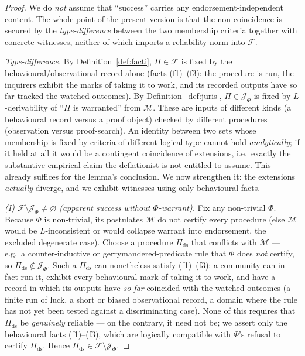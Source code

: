 \documentclass{amsart}
\theoremstyle{definition}
\theoremstyle{plain}
\theoremstyle{remark}
\begin{document}
\begin{proof}
We do \emph{not} assume that ``success'' carries any endorsement-independent
content. The whole point of the present version is that the non-coincidence is
secured by the \emph{type-difference} between the two membership criteria
together with concrete witnesses, neither of which imports a reliability norm
into $\mathcal{F}$.

\emph{Type-difference.} By Definition~\ref{def:facti}, $\Pi\in\mathcal{F}$ is
fixed by the behavioural/observational record alone (facts (f1)--(f3): the
procedure is run, the inquirers exhibit the marks of taking it to work, and its
recorded outputs have so far tracked the watched outcomes). By
Definition~\ref{def:juris}, $\Pi\in\mathcal{J}_\Phi$ is fixed by
$L$-derivability of ``$\Pi$ is warranted'' from $\mathcal{M}$. These are inputs
of different kinds (a behavioural record versus a proof object) checked by
different procedures (observation versus proof-search). An identity between two
sets whose membership is fixed by criteria of different logical type cannot hold
\emph{analytically}; if it held at all it would be a contingent coincidence of
extensions, i.e.\ exactly the substantive empirical claim the deflationist is
not entitled to assume. This already suffices for the lemma's conclusion. We now
strengthen it: the extensions \emph{actually} diverge, and we exhibit witnesses
using only behavioural facts.

\emph{(I) $\mathcal{F}\setminus\mathcal{J}_\Phi\neq\varnothing$ (apparent
success without $\Phi$-warrant).} Fix any non-trivial $\Phi$. Because $\Phi$ is
non-trivial, its postulates $\mathcal{M}$ do not certify every procedure (else
$\mathcal{M}$ would be $L$-inconsistent or would collapse warrant into
endorsement, the excluded degenerate case). Choose a procedure $\Pi_{\mathrm{ds}}$
that conflicts with $\mathcal{M}$ --- e.g.\ a counter-inductive or
gerrymandered-predicate rule that $\Phi$ does \emph{not} certify, so
$\Pi_{\mathrm{ds}}\notin\mathcal{J}_\Phi$. Such a $\Pi_{\mathrm{ds}}$ can
nonetheless satisfy (f1)--(f3): a community can in fact run it, exhibit every
behavioural mark of taking it to work, and have a record in which its outputs
have \emph{so far} coincided with the watched outcomes (a finite run of luck, a
short or biased observational record, a domain where the rule has not yet been
tested against a discriminating case). None of this requires that
$\Pi_{\mathrm{ds}}$ be \emph{genuinely} reliable --- on the contrary, it need
not be; we assert only the behavioural facts (f1)--(f3), which are logically
compatible with $\Phi$'s refusal to certify $\Pi_{\mathrm{ds}}$. Hence
$\Pi_{\mathrm{ds}}\in\mathcal{F}\setminus\mathcal{J}_\Phi$.


\end{proof}
\end{document}
